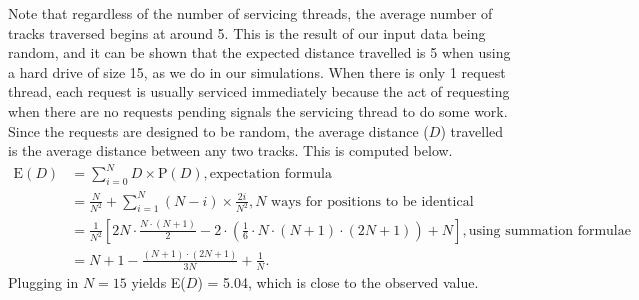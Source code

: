 \documentclass[12pt]{report}
\newcommand{\dsum}{\displaystyle\sum}
\begin{document}
Note that regardless of the number of servicing threads, the average number of tracks
traversed begins at around 5. This is the result of our input data being random, and it
can be shown that the expected distance travelled is 5 when using a hard drive of size 15,
as we do in our simulations. When there is only 1 request thread, each request is usually
serviced immediately because the act of requesting when there are no requests pending
signals the servicing thread to do some work. Since the requests are designed to be
random, the average distance ($D$) travelled is the average distance between any two
tracks. This is computed below.
\begin{align*}
\mathrm{E}(D) &= \dsum_{i=0}^N D\times\mathrm{P}(D),\text{expectation formula}\\
              &= \frac{N}{N^2} + \dsum_{i=1}^N (N - i)\times \frac{2i}{N^2},\text{$N$ ways for
                                                      positions to be identical} \\
              &= \frac{1}{N^2}\left[ 2N\cdot\frac{N\cdot(N+1)}{2} 
              - 2\cdot\left(\frac{1}{6}\cdot N \cdot (N+1) \cdot (2N + 1) \right)
              + N \right], \text{using summation formulae}\\
              &= N+1 - \frac{(N+1)\cdot(2N + 1)}{3N} + \frac{1}{N}.
\end{align*}
Plugging in $N = 15$ yields E($D$) = 5.04, which is close to the observed value.
%
%
%
\end{document}

